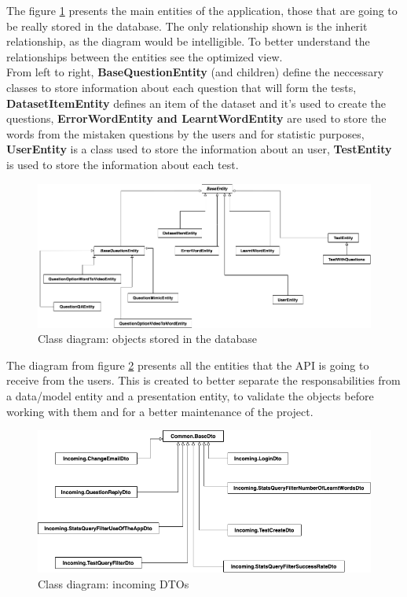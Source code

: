             The figure \ref{fig:implementation_entities_db} presents the main entities of the application, those that 
            are going to be really stored in the database. The only relationship shown is the inherit relationship, as the diagram would be intelligible. To better understand the 
            relationships between the entities see the optimized view. \\
            From left to right, \textbf{BaseQuestionEntity} (and children) define the neccessary classes to store 
            information about each question that will form the tests, \textbf{DatasetItemEntity} defines an item of the dataset and it's used to create the questions, 
            \textbf{ErrorWordEntity and LearntWordEntity} are used to store the words from the mistaken questions by the users and for statistic purposes, \textbf{UserEntity}
            is a class used to store the information about an user, \textbf{TestEntity} is used to store the information about each test.
            \begin{figure}[H]
                \centering
                    \includegraphics[width=\textwidth]{assets/diagrams/entities_bd.png}
                \caption{Class diagram: objects stored in the database}
                \label{fig:implementation_entities_db}
            \end{figure}

            The diagram from figure \ref{fig:implementation_dto_1} presents all the entities that the API is going to receive from the users. This is created to 
            better separate the responsabilities from a data/model entity and a presentation entity, to validate the objects before working with them and for a better
            maintenance of the project.
            \begin{figure}[H]
                \centering
                    \includegraphics[width=\textwidth]{assets/diagrams/incoming_dto.png}
                \caption{Class diagram: incoming DTOs}
                \label{fig:implementation_dto_1}
            \end{figure}

